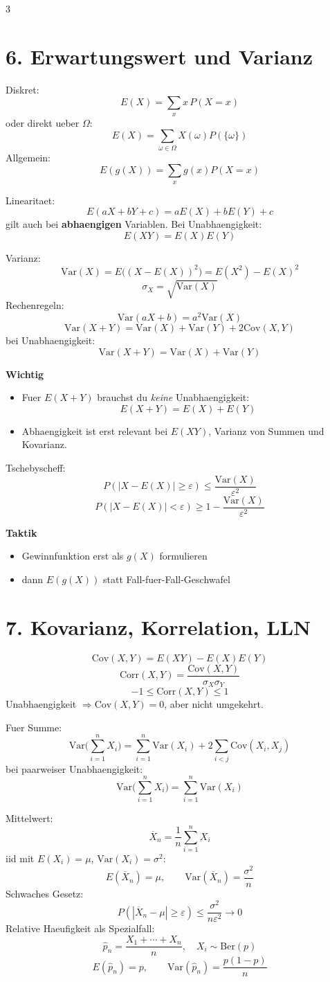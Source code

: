 \documentclass[a4paper,8pt,landscape]{article}
\newcommand{\Var}{\mathrm{Var}}
\newcommand{\Cov}{\mathrm{Cov}}
\newcommand{\Corr}{\mathrm{Corr}}
\newcommand{\Ber}{\mathrm{Ber}}
\begin{document}
\begin{multicols*}{3}
\section*{6. Erwartungswert und Varianz}
Diskret:
\[
E(X)=\sum_x x\,P(X=x)
\]
oder direkt ueber $\Omega$:
\[
E(X)=\sum_{\omega\in\Omega}X(\omega)P(\{\omega\})
\]
Allgemein:
\[
E(g(X))=\sum_x g(x)P(X=x)
\]

Linearitaet:
\[
E(aX+bY+c)=aE(X)+bE(Y)+c
\]
gilt auch bei \textbf{abhaengigen} Variablen.
Bei Unabhaengigkeit:
\[
E(XY)=E(X)E(Y)
\]

Varianz:
\[
\Var(X)=E\big((X-E(X))^2\big)=E(X^2)-E(X)^2
\]
\[
\sigma_X=\sqrt{\Var(X)}
\]
Rechenregeln:
\[
\Var(aX+b)=a^2\Var(X)
\]
\[
\Var(X+Y)=\Var(X)+\Var(Y)+2\Cov(X,Y)
\]
bei Unabhaengigkeit:
\[
\Var(X+Y)=\Var(X)+\Var(Y)
\]

\textbf{Wichtig}
\begin{itemize}
  \item Fuer $E(X+Y)$ brauchst du \emph{keine} Unabhaengigkeit:
  \[
  E(X+Y)=E(X)+E(Y)
  \]
  \item Abhaengigkeit ist erst relevant bei $E(XY)$, Varianz von Summen und Kovarianz.
\end{itemize}

Tschebyscheff:
\[
P(|X-E(X)|\ge \varepsilon)\le \frac{\Var(X)}{\varepsilon^2}
\]
\[
P(|X-E(X)|<\varepsilon)\ge 1-\frac{\Var(X)}{\varepsilon^2}
\]

\textbf{Taktik}
\begin{itemize}
  \item Gewinnfunktion erst als $g(X)$ formulieren
  \item dann $E(g(X))$ statt Fall-fuer-Fall-Geschwafel
\end{itemize}

\section*{7. Kovarianz, Korrelation, LLN}
\[
\Cov(X,Y)=E(XY)-E(X)E(Y)
\]
\[
\Corr(X,Y)=\frac{\Cov(X,Y)}{\sigma_X\sigma_Y}
\]
\[
-1\le \Corr(X,Y)\le 1
\]
Unabhaengigkeit $\Rightarrow \Cov(X,Y)=0$, aber nicht umgekehrt.

Fuer Summe:
\[
\Var\Big(\sum_{i=1}^n X_i\Big)=\sum_{i=1}^n \Var(X_i)+2\sum_{i<j}\Cov(X_i,X_j)
\]
bei paarweiser Unabhaengigkeit:
\[
\Var\Big(\sum_{i=1}^n X_i\Big)=\sum_{i=1}^n \Var(X_i)
\]

Mittelwert:
\[
\overline X_n=\frac{1}{n}\sum_{i=1}^n X_i
\]
iid mit $E(X_i)=\mu$, $\Var(X_i)=\sigma^2$:
\[
E(\overline X_n)=\mu,\qquad \Var(\overline X_n)=\frac{\sigma^2}{n}
\]
Schwaches Gesetz:
\[
P(|\overline X_n-\mu|\ge \varepsilon)\le \frac{\sigma^2}{n\varepsilon^2}\to 0
\]
Relative Haeufigkeit als Spezialfall:
\[
\hat p_n=\frac{X_1+\cdots+X_n}{n},\quad X_i\sim\Ber(p)
\]
\[
E(\hat p_n)=p,\qquad \Var(\hat p_n)=\frac{p(1-p)}{n}
\]


\end{multicols*}
\end{document}
